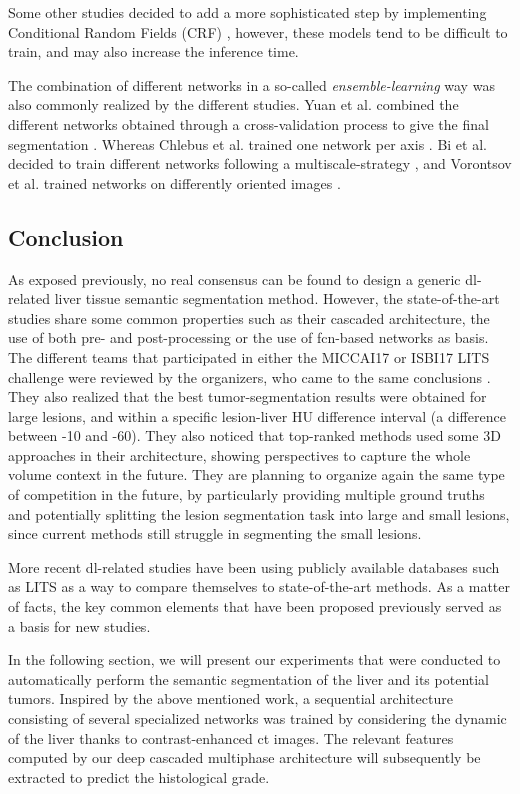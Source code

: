 Some other studies decided to add a more sophisticated step by
implementing Conditional Random Fields (CRF) \cite{Christ2017, Rafiei2018, Dou2016}, however, these models
tend to be difficult to train, and may also
increase the inference time.

The combination of different networks in a so-called
\emph{ensemble-learning} way was also commonly realized by the different
studies. Yuan et al. combined the different networks obtained
through a cross-validation process to give the final segmentation \cite{Yuan2017}.
Whereas Chlebus et al. trained one network per axis \cite{Chlebus2018}. Bi et al. decided to train different networks following a
multiscale-strategy \cite{Bi2017}, and Vorontsov et al. trained networks on
differently oriented images \cite{Vorontsov2018}.

\subsection{Conclusion}

As exposed previously, no real consensus can be found to design a
generic \ac{dl}-related liver tissue semantic segmentation method. However,
the state-of-the-art studies share some common properties such as their
cascaded architecture, the use of both pre- and post-processing or the
use of \ac{fcn}-based networks as basis.
The different teams that participated in either the MICCAI17 or ISBI17
LITS challenge were reviewed by the organizers, who came to the same
conclusions \cite{Bilic2019}.
They also realized that the best tumor-segmentation results were
obtained for large lesions, and within a specific lesion-liver HU
difference interval (a difference between -10 and -60).
They also noticed that top-ranked methods used some 3D approaches in
their architecture, showing perspectives to capture the whole
volume context in the future. They are planning to organize again the same
type of competition in the future, by particularly providing multiple
ground truths and potentially splitting the lesion segmentation task
into large and small lesions, since current methods still struggle in
segmenting the small lesions.

More recent \ac{dl}-related studies have been using publicly available
databases such as LITS as a way to compare themselves to
state-of-the-art methods. As a matter of facts, the key common elements
that have been proposed previously served as a basis for new studies.

In the following section, we will present our experiments that were conducted to automatically perform the semantic segmentation of the liver and its potential tumors. Inspired by the above mentioned work, a sequential architecture consisting of several specialized networks was trained by considering the dynamic of the liver thanks to contrast-enhanced \ac{ct} images. The relevant features computed by our deep cascaded multiphase architecture will subsequently be extracted to predict the histological grade.


